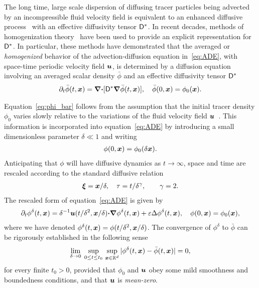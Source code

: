 \documentclass[amsa]{ipart}
\begin{document}
The long time, large scale dispersion of diffusing tracer particles
being advected by an incompressible fluid velocity field is equivalent
to an enhanced diffusive process~\cite{Taylor:PRSL:196} with an
effective diffusivity tensor $\mathsf{D}^*$. In recent decades, methods of
homogenization
theory~\cite{McLaughlin:SIAM_JAM:780,Fannjiang:1994:SIAM_JAM:333,Majda:Kramer:1999:book}
have been used to provide an explicit representation for
$\mathsf{D}^*$. In particular, these methods have demonstrated that the
averaged or \emph{homogenized} behavior of the advection-diffusion
equation in~\eqref{eq:ADE}, with space-time periodic velocity field
$\boldsymbol{u}$, is determined by a diffusion equation
involving an averaged scalar density $\bar{\phi}$ and an
effective diffusivity tensor
$\mathsf{D}^*$~\cite{Majda:Kramer:1999:book}       
%
\begin{align}\label{eq:phi_bar}
 \partial_t\bar{\phi}(t,\vecx)=\bnabla\bcdot[\Dm^*\bnabla \bar{\phi}(t,\vecx)], \quad
  \bar{\phi}(0,\vecx)=\phi_0(\vecx).
\end{align}




Equation~\eqref{eq:phi_bar}
follows from the assumption that the
initial tracer density $\phi_0$ varies slowly relative to the variations
of the fluid velocity field 
$\boldsymbol{u}$~\cite{McLaughlin:SIAM_JAM:780,Fannjiang:1997:1033,Majda:Kramer:1999:book}.
This information is incorporated into equation~\eqref{eq:ADE} by
introducing a small dimensionless parameter $\delta\ll1$ and
writing~\cite{McLaughlin:SIAM_JAM:780,Fannjiang:1997:1033,Majda:Kramer:1999:book}      
%
\begin{align}
  \phi(0,\vecx)=\phi_0(\delta\vecx). 
\end{align}
%
Anticipating that $\phi$ will have diffusive dynamics as $t\to\infty$, space and 
time are rescaled according to the standard diffusive relation
%
\begin{align}\label{eq:Fast_Vars}
  \vecxi=\vecx/\delta, \quad
  \tau= t/\delta^\gamma,
  \qquad
  \gamma=2.
\end{align}
%
The rescaled form of equation~\eqref{eq:ADE} is given
by~\cite{Majda:Kramer:1999:book}  
%
\begin{align}\label{eq:ADE_delta}
  \partial_t\phi^\delta(t,\vecx)=\delta^{-1}\vecu(t/\delta^2,\vecx/\delta)\bcdot\bnabla\phi^\delta(t,\vecx)
              +\varepsilon\Delta\phi^\delta(t,\vecx),
              \quad
             \phi(0,\vecx)=\phi_0(\vecx), 
\end{align}
%
where we have denoted $\phi^\delta(t,\boldsymbol{x})=\phi(t/\delta^2,\boldsymbol{x}/\delta)$.
The convergence of $\phi^\delta$  to $\bar{\phi}$
 can be rigorously established in the following
sense~\cite{Majda:Kramer:1999:book}   
%
\begin{align}\label{eq:Homogenization_Theorem}
  \lim_{\delta\to0}\;\sup_{0\leq t\leq t_0}\,\sup_{\vecx\in\mathbb{R}^d}
  |\phi^\delta(t,\vecx)-\bar{\phi}(t,\vecx)| =0,
\end{align}
%
for every finite $t_0>0$, provided that $\phi_0$ and $\boldsymbol{u}$ obey some
mild smoothness and boundedness conditions, and that $\boldsymbol{u}$ is
\emph{mean-zero}.  
\end{document}
